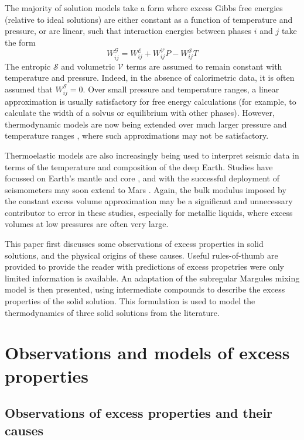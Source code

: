 The majority of solution models take a form where excess Gibbs free energies (relative to ideal solutions) are either constant as a function of temperature and pressure, or are linear, such that interaction energies between phases $i$ and $j$ take the form
\begin{equation}
  W_{ij}^{\mathcal{G}} = W_{ij}^{\mathcal{E}} + W_{ij}^{\mathcal{V}}P - W_{ij}^{\mathcal{S}}T
  \label{eqn:trad_form}
\end{equation}
The entropic $\mathcal{S}$ and volumetric $\mathcal{V}$ terms are assumed to remain constant with temperature and pressure. Indeed, in the absence of calorimetric data, it is often assumed that $W_{ij}^{\mathcal{S}} = 0$. Over small pressure and temperature ranges, a linear approximation is usually satisfactory for free energy calculations (for example, to calculate the width of a solvus or equilibrium with other phases). However, thermodynamic models are now being extended over much larger pressure and temperature ranges \citep{SLB2011, HP2011, HHPH2013, DKS2013}, where such approximations may not be satisfactory.

Thermoelastic models are also increasingly being used to interpret seismic data in terms of the temperature and composition of the deep Earth. Studies have focussed on Earth's mantle \citep[e.g.][]{DGDSBR2012, MCDRT2012, DCT2012} and core \citep[e.g.][]{SGGFMM2000,SFGMM2004}, and with the successful deployment of seismometers may soon extend to Mars \citep{GLZR2014}. Again, the bulk modulus imposed by the constant excess volume approximation may be a significant and unnecessary contributor to error in these studies, especially for metallic liquids, where excess volumes at low pressures are often very large. 

This paper first discusses some observations of excess properties in solid solutions, and the physical origins of these causes. Useful rules-of-thumb are provided to provide the reader with predictions of excess propetries were only limited information is available. An adaptation of the subregular Margules mixing model is then presented, using intermediate compounds to describe the excess properties of the solid solution. This formulation is used to model the thermodynamics of three solid solutions from the literature. 


\section{Observations and models of excess properties} 
\subsection{Observations of excess properties and their causes}

